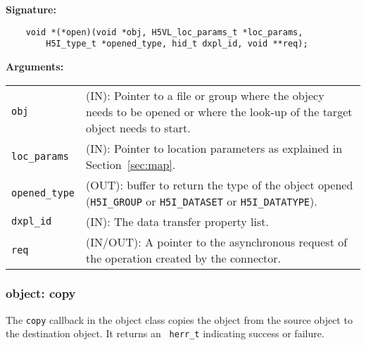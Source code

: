 \begin{mdframed}[style=bgbox]
\textbf{Signature:}
\begin{lstlisting}
    void *(*open)(void *obj, H5VL_loc_params_t *loc_params, 
        H5I_type_t *opened_type, hid_t dxpl_id, void **req);
\end{lstlisting}

\textbf{Arguments:}\\
\begin{tabular}{l p{13.5cm}}
  \texttt{obj} & (IN): Pointer to a file or group where the objecy needs to be
  opened or where the look-up of the target object needs to start.\\
  \texttt{loc\_params} & (IN): Pointer to location parameters as explained in
  Section~\ref{sec:map}.\\
  \texttt{opened\_type} & (OUT): buffer to return the type of the object
  opened (\texttt{H5I\_GROUP} or \texttt{H5I\_DATASET} or \texttt{H5I\_DATATYPE}).\\
  \texttt{dxpl\_id} & (IN): The data transfer property list.\\
  \texttt{req} & (IN/OUT): A pointer to the asynchronous request of the
  operation created by the connector.\\
\end{tabular}
\end{mdframed}

\subsubsection{object: copy}
The \texttt{copy} callback in the object class  copies the object
from the source object to the destination object. It returns an \texttt{
  herr\_t} indicating success or failure.\bigskip

